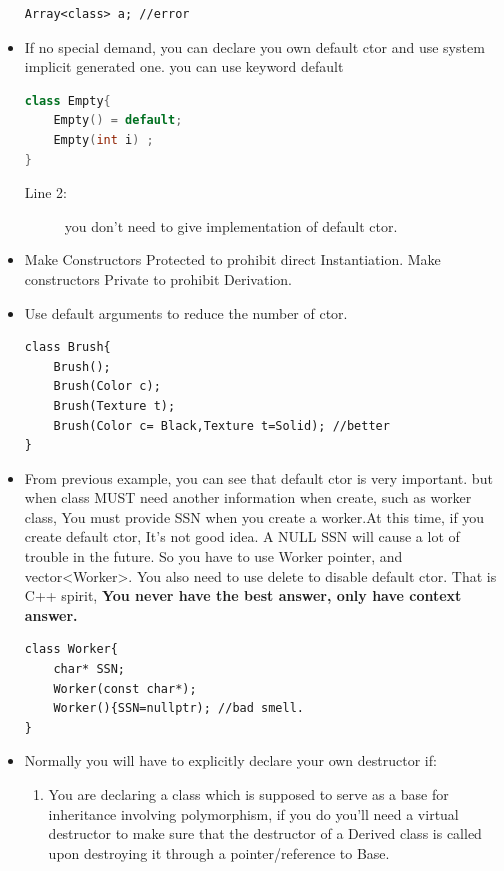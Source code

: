 \documentclass[a4paper,11pt,twoside]{book}
\begin{document}
\begin{itemize}
\begin{lstlisting}[numbers=none]
Array<class> a; //error
	\end{lstlisting}
	
	\item If no special demand, you can declare you own default ctor and use system implicit generated one. you can use keyword default
\begin{lstlisting}[frame=single, language=c++]
class Empty{
	Empty() = default;
	Empty(int i) ;
}
\end{lstlisting}
\begin{description}
	\item[Line 2:] you don't need to give implementation of default ctor.
\end{description}
	
	\item Make Constructors Protected to prohibit direct Instantiation. Make constructors Private to prohibit Derivation.
	
	\item Use default arguments to reduce the number of ctor.
\begin{lstlisting}[numbers=none]
class Brush{
	Brush();
	Brush(Color c);
	Brush(Texture t);
	Brush(Color c= Black,Texture t=Solid); //better
}
\end{lstlisting}
	
	
	\item From previous example, you can see that default ctor is very important. but when class MUST need another information when create, such as  worker class, You must provide SSN when you create a worker.At this time, if you create default ctor, It's not good idea. A NULL SSN will cause a lot of trouble in the future.  So you have to use Worker pointer, and vector<Worker>.  You also need to use delete to disable default ctor. That is C++ spirit, \textbf{You never have the best answer, only have context answer. }
\begin{lstlisting}[numbers=none]
class Worker{
	char* SSN;
	Worker(const char*);
	Worker(){SSN=nullptr); //bad smell.
}
\end{lstlisting}
	
	\item Normally you will have to explicitly declare your own destructor if:
	\begin{enumerate}
		\item You are declaring a class which is supposed to serve as a base for inheritance involving polymorphism, if you do you'll need a virtual destructor to make sure that the destructor of a Derived class is called upon destroying it through a pointer/reference to Base.
		

\end{enumerate}
\end{itemize}
\end{document}
